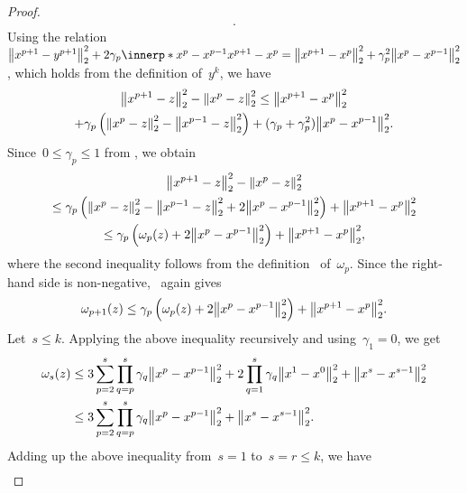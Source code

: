 \documentclass[../main]{subfiles}
\begin{document}
\begin{proof}
\begin{multline}
    .\end{multline}
    Using the relation~$\norm*{x^{p + 1} - y^{p + 1}}_2^2 + 2 \gamma_p \innerp*{x^p - x^{p - 1}}{x^{p + 1} - x^p} = \norm*{x^{p + 1} - x^p}_2^2 + \gamma_p^2 \norm*{x^p - x^{p - 1}}_2^2$, which holds from the definition of~$y^k$, we have
    \begin{multline}
        \norm*{x^{p + 1} - z}_2^2 - \norm*{x^p - z}_2^2
        \le \norm*{x^{p + 1} - x^p}_2^2 \\
        + \gamma_p \left( \norm*{x^p - z}_2^2 - \norm*{x^{p - 1} - z}_2^2 \right) + ( \gamma_p + \gamma_p^2 ) \norm*{x^p - x^{p - 1}}_2^2
    .\end{multline}
    Since~$0 \le \gamma_p \le 1$ from , we obtain
    \begin{multline}
        \norm*{x^{p + 1} - z}_2^2 - \norm*{x^p - z}_2^2 \\
        \le \gamma_p \left( \norm*{x^p - z}_2^2 - \norm*{x^{p - 1} - z}_2^2 + 2 \norm*{x^p - x^{p - 1}}_2^2 \right) + \norm*{x^{p + 1} - x^p}_2^2 \\
        \le \gamma_p \left( \omega_p(z) + 2 \norm*{x^p - x^{p - 1}}_2^2 \right) + \norm*{x^{p + 1} - x^p}_2^2
    ,\end{multline}
    where the second inequality follows from the definition~ of~$\omega_p$.
    Since the right-hand side is non-negative,~ again gives
    \begin{equation}
        \omega_{p + 1}(z) \le \gamma_p \left( \omega_p(z) + 2 \norm*{x^p - x^{p - 1}}_2^2 \right) + \norm*{x^{p + 1} - x^p}_2^2 
    .\end{equation}
    Let~$s \le k$.
    Applying the above inequality recursively and using~$\gamma_1 = 0$, we get
    \begin{equation}
        \begin{split}
            \omega_s(z) &\le 3 \sum_{p = 2}^{s} \prod_{q = p}^{s} \gamma_q \norm*{x^p - x^{p - 1}}_2^2 + 2 \prod_{q = 1}^{s} \gamma_q \norm*{x^1 - x^0}_2^2 + \norm*{x^s - x^{s - 1}}_2^2 \\
                        &\le 3 \sum_{p = 2}^{s} \prod_{q = p}^{s} \gamma_q \norm*{x^p - x^{p - 1}}_2^2 + \norm*{x^s - x^{s - 1}}_2^2
        .\end{split}
    \end{equation}
    Adding up the above inequality from~$s = 1$ to~$s = r \le k$, we have
    \begin{equation}
        \begin{split}

\end{split}
\end{equation}
\end{proof}
\end{document}
